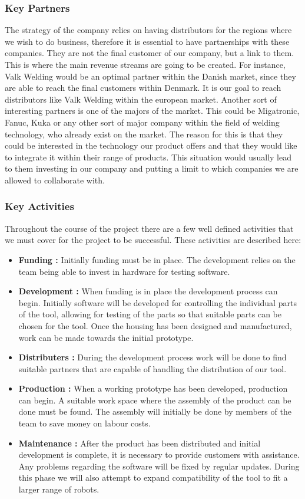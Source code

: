 \subsubsection{Key Partners}
The strategy of the company relies on having distributors for the regions where we wish to do business, therefore it is essential to have partnerships with these companies. They are not the final customer of our company, but a link to them. This is where the main revenue streams are going to be created.
For instance, Valk Welding would be an optimal partner within the Danish market, since they are able to reach the final customers within Denmark. It is our goal to reach distributors like Valk Welding within the european market.
Another sort of interesting partners is one of the majors of the market. This could be Migatronic, Fanuc, Kuka or any other sort of major company within the field of welding technology, who already exist on the market. The reason for this is that they could be interested in the technology our product offers and that they would like to integrate it within their range of products. This situation would usually lead to them investing in our company and putting a limit to which companies we are allowed to collaborate with.

\subsubsection{Key Activities}
Throughout the course of the project there are a few well defined activities that we must cover for the project to be successful. These activities are described here:

\begin{itemize}
	\item \textbf{Funding		:} Initially funding must be in place. The development relies on the team being able to invest in hardware for testing software. 
	\item \textbf{Development	:} When funding is in place the development process can begin. Initially software will be developed for controlling the individual parts of the tool, allowing for testing of the parts so that suitable parts can be chosen for the tool. Once the housing has been designed and manufactured, work can be made towards the initial prototype.
	\item \textbf{Distributers	:} During the development process work will be done to find suitable partners that are capable of handling the distribution of our tool.
	\item \textbf{Production	:} When a working prototype has been developed, production can begin. A suitable work space where the assembly of the product can be done must be found. The assembly will initially be done by members of the team to save money on labour costs. 
	\item \textbf{Maintenance	:} After the product has been distributed and initial development is complete, it is necessary to provide customers with assistance. Any problems regarding the software will be fixed by regular updates. During this phase we will also attempt to expand compatibility of the tool to fit a larger range of robots.
\end{itemize} 

